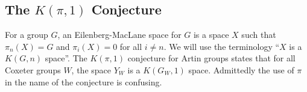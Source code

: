 \documentclass[class=article, crop=false]{standalone}
\begin{document}
	
\subsection{The $K(\pi,1)$ Conjecture}
For a group $G$, an Eilenberg-MacLane space \cite{eilenberg_relations_1945} for $G$ is a space $X$ such that $\pi_n(X)=G$ and $\pi_i(X) = 0$ for all $i\neq n$. We will use the terminology ``$X$ is a $K(G,n)$ space''. The $K(\pi,1)$ conjecture for Artin groups states that for all Coxeter groups $W$, the space $Y_W$ is a $K(G_W,1)$ space. Admittedly the use of $\pi$ in the name of the conjecture is confusing.
	
\end{document}
